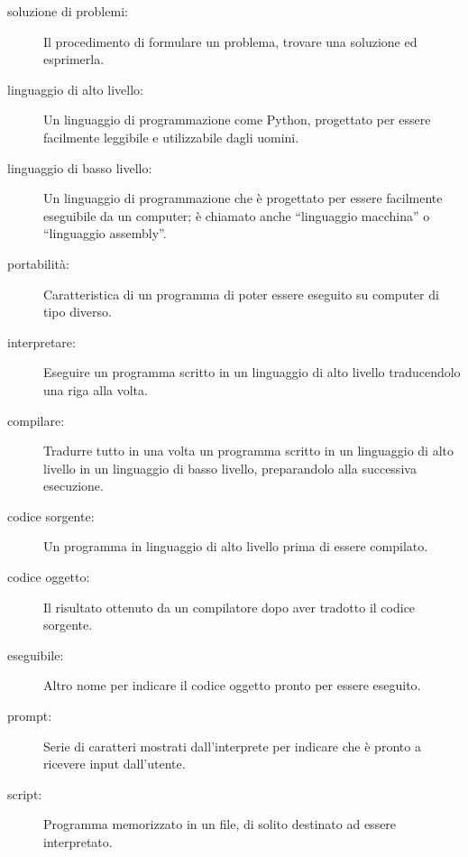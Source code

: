 \documentclass[10pt]{book}
\begin{document}
\begin{description}

\item[soluzione di problemi:]  Il procedimento di formulare un problema, trovare una soluzione ed esprimerla.

\item[linguaggio di alto livello:]  Un linguaggio di programmazione come Python, progettato per essere facilmente leggibile e utilizzabile dagli uomini.

\item[linguaggio di basso livello:]  Un linguaggio di programmazione che è progettato per essere facilmente eseguibile da un computer; è chiamato anche    ``linguaggio macchina'' o ``linguaggio assembly''.

\item[portabilità:]  Caratteristica di un programma di poter essere eseguito su computer di tipo diverso.

\item[interpretare:]  Eseguire un programma scritto in un linguaggio di alto livello traducendolo una riga alla volta.

\item[compilare:]  Tradurre tutto in una volta un programma scritto in un linguaggio di alto livello in un linguaggio di basso livello, preparandolo alla successiva esecuzione.

\item[codice sorgente:]  Un programma in linguaggio di alto livello prima di essere compilato.

\item[codice oggetto:]  Il risultato ottenuto da un compilatore dopo aver tradotto il codice sorgente.

\item[eseguibile:]  Altro nome per indicare il codice oggetto pronto per essere eseguito.

\item[prompt:] Serie di caratteri mostrati dall'interprete per indicare che è pronto a ricevere input dall'utente.

\item[script:] Programma memorizzato in un file, di solito destinato ad      essere interpretato.


\end{description}
\end{document}
